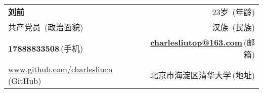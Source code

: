 \newcommand{\myheader}{
\begin{tabular*}{\textwidth}{l@{\extracolsep{\fill}}r}
  \textbf{\href{http://www.github.com/charlesliucn}{\LARGE 刘前}} & 23岁$\,$ {\color{labelgrey}(年龄)} \\
  共产党员 $\,${\color{labelgrey}(政治面貌)} & 汉族 $\,${\color{labelgrey}(民族)}\\
  \textbf{17888833508}$\,${\color{labelgrey}(手机)} & \href{mailto:charlesliutop@163.com}{\textbf{charlesliutop@163.com}}$\,${\color{labelgrey}(邮箱)}\\
  \href{http://www.github.com/charlesliucn}{www.github.com/charlesliucn}$\,${\color{labelgrey}(GitHub)} & 北京市海淀区清华大学$\,${\color{labelgrey}(地址)}\\
  \end{tabular*}\\\vspace{0.15in}}

\myheader